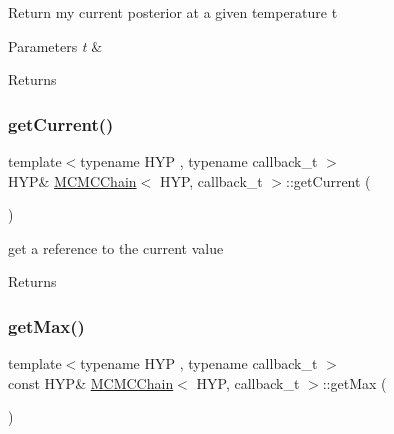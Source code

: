 Return my current posterior at a given temperature t 
\begin{DoxyParams}{Parameters}
{\em t} & \\
\hline
\end{DoxyParams}
\begin{DoxyReturn}{Returns}

\end{DoxyReturn}
\mbox{\label{class_m_c_m_c_chain_ae76c66b5bcbc02df926e5f9a91acff17}} 
\subsubsection{\texorpdfstring{get\+Current()}{getCurrent()}}
{\footnotesize\ttfamily template$<$typename H\+YP , typename callback\+\_\+t $>$ \\
H\+YP\& \hyperlink{class_m_c_m_c_chain}{M\+C\+M\+C\+Chain}$<$ H\+YP, callback\+\_\+t $>$\+::get\+Current (\begin{DoxyParamCaption}{ }\end{DoxyParamCaption})\hspace{0.3cm}{\ttfamily [inline]}}

get a reference to the current value \begin{DoxyReturn}{Returns}

\end{DoxyReturn}
\mbox{\label{class_m_c_m_c_chain_aa5c2bf3cae9a5959cab43e04b1201ed2}} 
\subsubsection{\texorpdfstring{get\+Max()}{getMax()}}
{\footnotesize\ttfamily template$<$typename H\+YP , typename callback\+\_\+t $>$ \\
const H\+YP\& \hyperlink{class_m_c_m_c_chain}{M\+C\+M\+C\+Chain}$<$ H\+YP, callback\+\_\+t $>$\+::get\+Max (\begin{DoxyParamCaption}{ }\end{DoxyParamCaption})\hspace{0.3cm}{\ttfamily [inline]}}

\mbox{\label{class_m_c_m_c_chain_aef30134b1915b8b494040771480d6b80}} 
